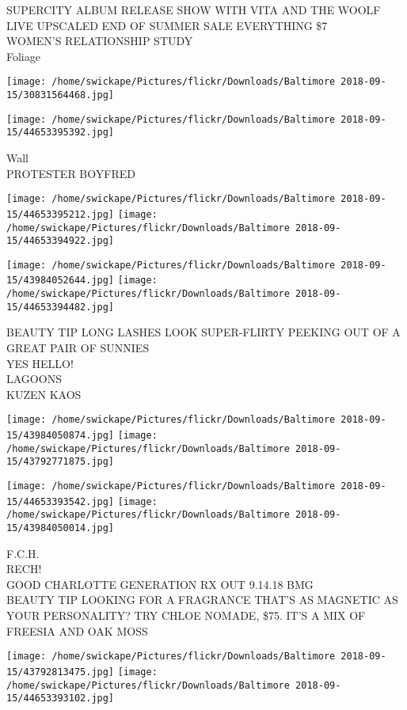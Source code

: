 \documentclass[10pt,letterpaper]{article}
\begin{document}
SUPERCITY ALBUM RELEASE SHOW WITH VITA AND THE WOOLF\\
LIVE UPSCALED END OF SUMMER SALE EVERYTHING \$7\\
WOMEN'S RELATIONSHIP STUDY\\
Foliage
\pagebreak

\texttt{[image: /home/swickape/Pictures/flickr/Downloads/Baltimore 2018-09-15/30831564468.jpg]}

\vspace{0.25in}
\texttt{[image: /home/swickape/Pictures/flickr/Downloads/Baltimore 2018-09-15/44653395392.jpg]}

Wall\\
PROTESTER BOYFRED
\pagebreak

\texttt{[image: /home/swickape/Pictures/flickr/Downloads/Baltimore 2018-09-15/44653395212.jpg]}
\texttt{[image: /home/swickape/Pictures/flickr/Downloads/Baltimore 2018-09-15/44653394922.jpg]}

\texttt{[image: /home/swickape/Pictures/flickr/Downloads/Baltimore 2018-09-15/43984052644.jpg]}
\texttt{[image: /home/swickape/Pictures/flickr/Downloads/Baltimore 2018-09-15/44653394482.jpg]}

BEAUTY TIP LONG LASHES LOOK SUPER{-}FLIRTY PEEKING OUT OF A GREAT PAIR OF SUNNIES\\
YES HELLO!\\
LAGOONS\\
KUZEN KAOS
\pagebreak

\texttt{[image: /home/swickape/Pictures/flickr/Downloads/Baltimore 2018-09-15/43984050874.jpg]}
\texttt{[image: /home/swickape/Pictures/flickr/Downloads/Baltimore 2018-09-15/43792771875.jpg]}

\texttt{[image: /home/swickape/Pictures/flickr/Downloads/Baltimore 2018-09-15/44653393542.jpg]}
\texttt{[image: /home/swickape/Pictures/flickr/Downloads/Baltimore 2018-09-15/43984050014.jpg]}

F.C.H.\\
RECH!\\
GOOD CHARLOTTE GENERATION RX OUT 9.14.18 BMG\\
BEAUTY TIP LOOKING FOR A FRAGRANCE THAT'S AS MAGNETIC AS YOUR PERSONALITY?  TRY CHLOE NOMADE, \$75.  IT'S A MIX OF FREESIA AND OAK MOSS
\pagebreak

\texttt{[image: /home/swickape/Pictures/flickr/Downloads/Baltimore 2018-09-15/43792813475.jpg]}
\texttt{[image: /home/swickape/Pictures/flickr/Downloads/Baltimore 2018-09-15/44653393102.jpg]}
\end{document}
